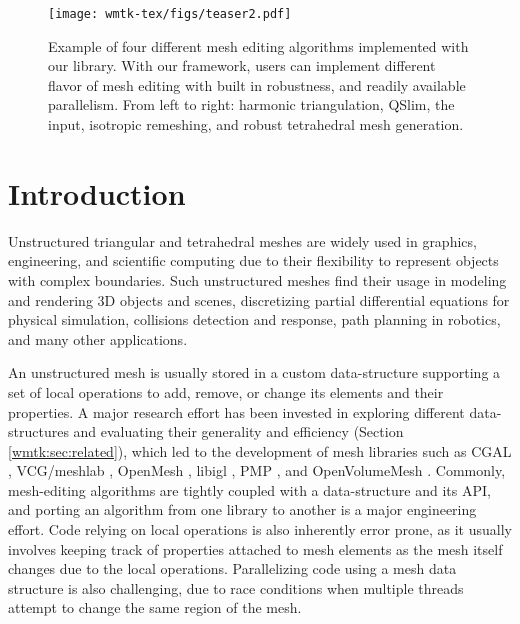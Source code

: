 
\begin{figure}
    \centering\footnotesize
    \texttt{[image: wmtk-tex/figs/teaser2.pdf]}
    \caption{{Example of four different mesh editing algorithms implemented with our library. With our framework, users can implement different flavor of mesh editing with built in robustness, and readily available parallelism. From left to right: harmonic triangulation, QSlim, the input, isotropic remeshing, and robust tetrahedral mesh generation. }}
    \label{wmtk:fig:teaser}
\end{figure}

\section{Introduction}

Unstructured triangular and tetrahedral meshes are widely used in graphics, engineering, and scientific computing due to their flexibility to represent objects with complex boundaries. Such unstructured meshes find their usage in modeling and rendering 3D objects and scenes, discretizing partial differential equations for physical simulation,  collisions detection and response, path planning in robotics, and many other applications.

{An unstructured} mesh is usually stored in a custom data-structure supporting a set of local operations to add, remove, or change its elements and their properties. A major research effort has been invested in exploring different data-structures and evaluating their generality and efficiency (Section \ref{wmtk:sec:related}), which led to the development of mesh libraries such as CGAL \cite{cgal2008computational}, VCG/meshlab \cite{vcg}, OpenMesh \cite{botsch2002openmesh}, libigl \cite{jacobson2016libigl}, PMP \cite{pmp-library}, and OpenVolumeMesh \cite{kremer2013openvolumemesh}.
Commonly, mesh-editing algorithms are tightly coupled with a data-structure and its API, and porting an algorithm from one library to another is a major engineering effort. 
Code relying on local operations is also inherently error prone, as it usually involves keeping track of properties attached to mesh elements as the mesh itself changes due to the local operations. Parallelizing code using a mesh data structure is also challenging, due to race conditions when multiple threads attempt to change the same region of the mesh. 

